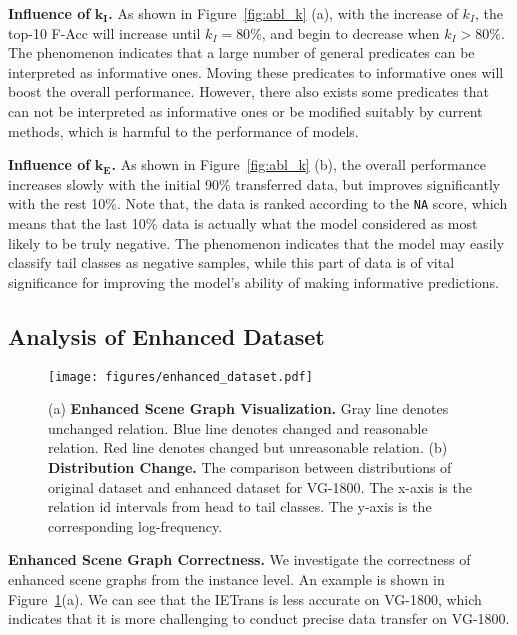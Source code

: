 \documentclass[runningheads]{llncs}
\begin{document}
\smallskip
\noindent
\textbf{Influence of }$ \boldsymbol{k_I} $\textbf{.}
As shown in Figure~\ref{fig:abl_k} (a), with the increase of $k_I$, the top-10 F-Acc will increase until $k_I=80\%$, and begin to decrease when $k_I>80\%$.
The phenomenon indicates that a large number of general predicates can be interpreted as informative ones.
Moving these predicates to informative ones will boost the overall performance.
However, there also exists some predicates that can not be interpreted as informative ones or be modified suitably by current methods, which is harmful to the performance of models.

\smallskip
\noindent
\textbf{Influence of }$ \boldsymbol{k_E} $\textbf{.}
As shown in Figure~\ref{fig:abl_k} (b), the overall performance increases slowly with the initial 90\% transferred data, but improves significantly with the rest 10\%. 
Note that, the data is ranked according to the \texttt{NA} score, which means that the last 10\% data is actually what the model considered as most likely to be truly negative.
The phenomenon indicates that the model may easily classify tail classes as negative samples, while this part of data is of vital significance for improving the model's ability of making informative predictions.



\subsection{Analysis of Enhanced Dataset}


\begin{figure}[t]
    \centering
    \texttt{[image: figures/enhanced\_dataset.pdf]}
    \caption{(a) \textbf{Enhanced Scene Graph Visualization.} Gray line denotes unchanged relation. Blue line denotes changed and reasonable relation. Red line denotes changed but unreasonable relation. (b) \textbf{Distribution Change.} The comparison between distributions of original dataset and enhanced dataset for VG-1800. 
    The x-axis is the relation id intervals from head to tail classes. The y-axis is the corresponding log-frequency.}
    \label{fig:enhanced_dataset}
\end{figure}


\smallskip
\noindent
\textbf{Enhanced Scene Graph Correctness.}
We investigate the correctness of enhanced scene graphs from the instance level.
An example is shown in Figure~\ref{fig:enhanced_dataset}(a).
We can see that the IETrans is less accurate on VG-1800, which indicates that it is more challenging to conduct precise data transfer on VG-1800.
\end{document}
